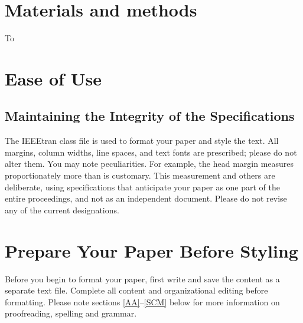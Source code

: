 \documentclass[conference]{IEEEtran}
\begin{document}
\begin{figure}[tbh]
\end{figure}


\section{Materials and methods}
To 




\section{Ease of Use}

\subsection{Maintaining the Integrity of the Specifications}

The IEEEtran class file is used to format your paper and style the text. All margins, 
column widths, line spaces, and text fonts are prescribed; please do not 
alter them. You may note peculiarities. For example, the head margin
measures proportionately more than is customary. This measurement 
and others are deliberate, using specifications that anticipate your paper 
as one part of the entire proceedings, and not as an independent document. 
Please do not revise any of the current designations.

\section{Prepare Your Paper Before Styling}
Before you begin to format your paper, first write and save the content as a 
separate text file. Complete all content and organizational editing before 
formatting. Please note sections \ref{AA}--\ref{SCM} below for more information on 
proofreading, spelling and grammar.
\end{document}
